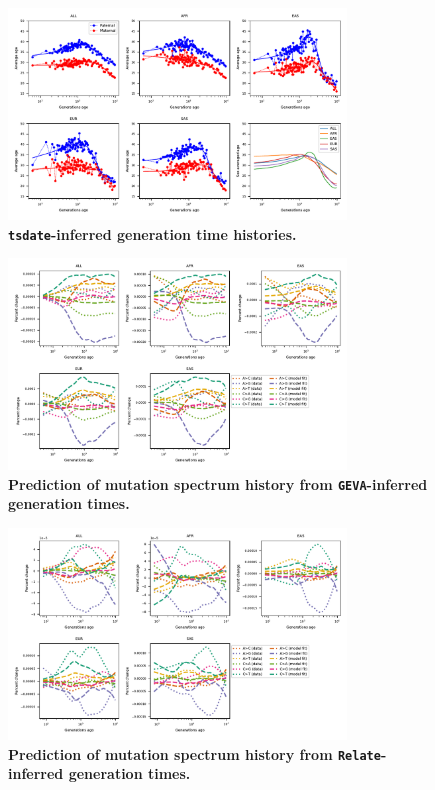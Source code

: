 \documentclass[]{article}
\newcommand{\GEVA}{\texttt{GEVA}\xspace}
\newcommand{\tsdate}{\texttt{tsdate}\xspace}
\newcommand{\relate}{\texttt{Relate}\xspace}
\begin{document}
\begin{figure}[ht!]
    \centering
    \includegraphics[width=0.8\textwidth]{../plots/inferred_generation_times.tsdate.pdf}
    \caption{
        \textbf{\tsdate-inferred generation time histories.}
    }
    \label{fig:tsdate-gen-times}
\end{figure}


\begin{figure}[ht!]
    \centering
    \includegraphics[width=0.8\textwidth]{../plots/goodness-of-fit.geva.max_age.10000.pdf}
    \caption{
        \textbf{Prediction of mutation spectrum history from
        \GEVA-inferred generation times.}
    }
    \label{fig:geva-fit}
\end{figure}


\begin{figure}[ht!]
    \centering
    \includegraphics[width=0.8\textwidth]{../plots/goodness-of-fit.relate.pdf}
    \caption{
        \textbf{Prediction of mutation spectrum history from
        \relate-inferred generation times.}
    }
    \label{fig:relate-fit}
\end{figure}
\end{document}
